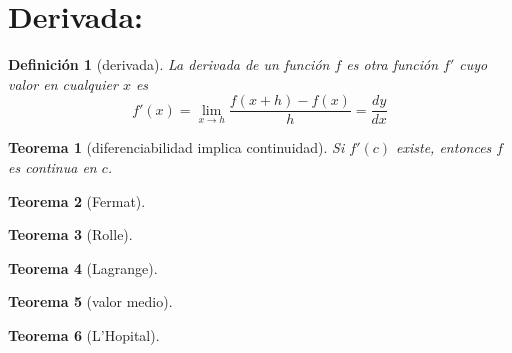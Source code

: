 \documentclass{article}
\newtheorem*{theorem}{Teorema}
\newtheorem*{definition}{Definición}
\begin{document}
  \section*{Derivada:}
    \begin{definition}[derivada]
      La derivada de un función $f$ es otra función $f'$ cuyo valor en cualquier
      $x$ es
      \begin{equation*}
        f'(x)=\lim_{x\to h}\frac{f(x+h)-f(x)}{h}=\frac{dy}{dx}
      \end{equation*}
    \end{definition}
    \begin{theorem}[diferenciabilidad implica continuidad]
      Si $f'(c)$ existe, entonces $f$ es continua en $c$.
    \end{theorem}
    \begin{theorem}[Fermat]
    \end{theorem}
    \begin{theorem}[Rolle]
    \end{theorem}
    \begin{theorem}[Lagrange]
    \end{theorem}
    \begin{theorem}[valor medio]
    \end{theorem}
    \begin{theorem}[L'Hopital]
    \end{theorem}
    
\end{document}
